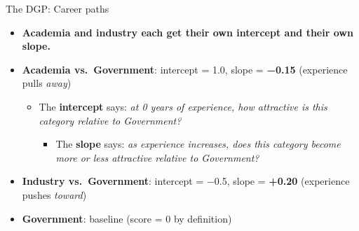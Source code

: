 \documentclass[
  ignorenonframetext,
]{beamer}
\providecommand{\tightlist}{%
  \setlength{\itemsep}{0pt}\setlength{\parskip}{0pt}}
\begin{document}
\begin{frame}[fragile]{The DGP: Career paths}
{\begin{itemize}
\begin{itemize}
    \begin{itemize}
    \tightlist
    \item
      \textbf{Academia and industry each get their own intercept and
      their own slope.}
    \end{itemize}
  \end{itemize}
\end{itemize}}

\pause

\begin{tcolorbox}[enhanced jigsaw, colback=white, coltitle=black, titlerule=0mm, rightrule=.15mm, bottomtitle=1mm, leftrule=.75mm, opacitybacktitle=0.6, breakable, title=\textcolor{quarto-callout-note-color}{\faInfo}\hspace{0.5em}{The truth we're planting}, arc=.35mm, toptitle=1mm, bottomrule=.15mm, colframe=quarto-callout-note-color-frame, colbacktitle=quarto-callout-note-color!10!white, toprule=.15mm, opacityback=0, left=2mm]

\begin{itemize}
\tightlist
\item
  \textbf{Academia vs.~Government}: intercept = 1.0, slope =
  \textbf{−0.15} (experience pulls \emph{away})

  \begin{itemize}
  \tightlist
  \item
    The \textbf{intercept} says: \emph{at 0 years of experience, how
    attractive is this category relative to Government?}

    \begin{itemize}
    \tightlist
    \item
      The \textbf{slope} says: \emph{as experience increases, does this
      category become more or less attractive relative to Government?}
    \end{itemize}
  \end{itemize}
\item
  \textbf{Industry vs.~Government}: intercept = −0.5, slope =
  \textbf{+0.20} (experience pushes \emph{toward})
\item
  \textbf{Government}: baseline (score = 0 by definition)
\end{itemize}

\end{tcolorbox}

\end{frame}
\end{document}
